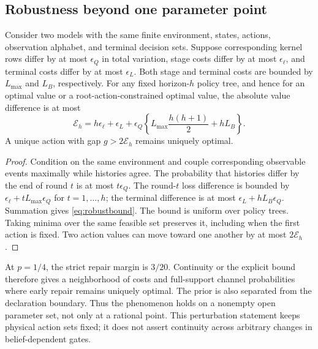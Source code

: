 \subsection{Robustness beyond one parameter point}
\begin{proposition}
\label{prop:robust}
Consider two models with the same finite environment, states, actions,
observation alphabet, and terminal decision sets. Suppose corresponding kernel
rows differ by at most $\epsilon_Q$ in total variation, stage costs differ by
at most $\epsilon_\ell$, and terminal costs differ by at most $\epsilon_L$.
Both stage and terminal costs are bounded by $L_{\max}$ and $L_B$, respectively.
For any fixed horizon-$h$ policy tree, and hence for an optimal value or a
root-action-constrained optimal value, the absolute value difference is at most
\begin{equation}
\mathcal E_h=
h\epsilon_\ell+\epsilon_L+
\epsilon_Q\left\{L_{\max}\frac{h(h+1)}2+hL_B\right\}.
\label{eq:robustbound}
\end{equation}
A unique action with gap $g>2\mathcal E_h$ remains uniquely optimal.
\end{proposition}
\begin{proof}
Condition on the same environment and couple corresponding observable events
maximally while histories agree. The probability that histories differ by the
end of round $t$ is at most $t\epsilon_Q$. The round-$t$ loss difference is
bounded by $\epsilon_\ell+tL_{\max}\epsilon_Q$ for $t=1,\ldots,h$; the terminal
difference is at most $\epsilon_L+hL_B\epsilon_Q$. Summation gives
\eqref{eq:robustbound}. The bound is uniform over policy trees. Taking minima
over the same feasible set preserves it, including when the first action is
fixed. Two action values can move toward one another by at most
$2\mathcal E_h$.
\end{proof}
At $p=1/4$, the strict repair margin is $3/20$. Continuity or the explicit bound
therefore gives a neighborhood of costs and full-support channel probabilities
where early repair remains uniquely optimal. The prior is also separated from
the declaration boundary. Thus the phenomenon holds on a nonempty open
parameter set, not only at a rational point. This perturbation statement keeps
physical action sets fixed; it does not assert continuity across arbitrary
changes in belief-dependent gates.
